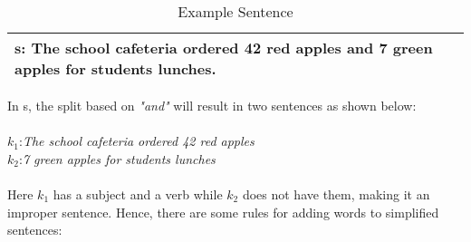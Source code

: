 \documentclass[11pt]{article}
\begin{document}
\begin{table}[H]
\centering
\begin{tabular}{ | m{7cm} | }
\hline
$\mathbf{s}$: The school cafeteria ordered 42 red apples and 7 green apples for students lunches.\\
\hline
\end{tabular}
\caption{Example Sentence}
\label{figure:2}
\end{table}

In s, the split based on \textit{"and"} will result in two sentences as shown below:
\\
\\
$\mathit{k_{1}}$:\textit{The school cafeteria ordered 42 red apples}\\
$\mathit{k_{2}}$:\textit{7 green apples for students lunches}
\\
\\
Here $\mathit{k_{1}}$ has a subject and a verb while $\mathit{k_{2}}$ does not have them, making it an improper sentence. Hence, there are some rules for adding words to simplified sentences:
\end{document}
